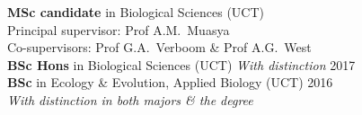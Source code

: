 \begin{hangparas}{2em}{1}

\textbf{MSc candidate} in Biological Sciences
  {\small (UCT)                                                               \\
  \hspace{2em} Principal supervisor: Prof A.M.~Muasya                         \\
  \hspace{2em} Co-supervisors: Prof G.A.~Verboom \& Prof A.G.~West}           \\
\textbf{BSc Hons} in Biological Sciences
  {\small (UCT) \textit{With distinction}                        \hfill 2017} \\
\textbf{BSc} in Ecology \& Evolution, Applied Biology
  {\small (UCT)                                                  \hfill 2016  \\
  \hspace{2em} \textit{With distinction in both majors \& the degree}}

\end{hangparas}
